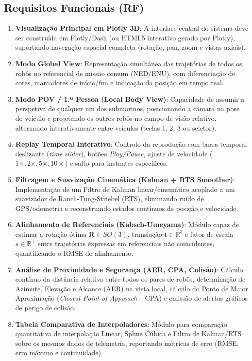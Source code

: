\documentclass[11pt,a4paper]{article}
\newcommand{\vv}[1]{\mathbf{#1}}
\newcommand{\Rot}{\mathbf{R}}
\begin{document}
\subsection{Requisitos Funcionais (RF)}

\begin{enumerate}[label=\textbf{RF\arabic*:},leftmargin=1.5cm]
    \item \textbf{Visualização Principal em Plotly 3D}: A interface central do sistema deve ser construída em Plotly/Dash (ou HTML5 interativo gerado por Plotly), suportando navegação espacial completa (rotação, pan, zoom e vistas axiais).
    \item \textbf{Modo Global View}: Representação simultânea das trajetórias de todos os robôs no referencial de missão comum (NED/ENU), com diferenciação de cores, marcadores de início/fim e indicação da posição em tempo real.
    \item \textbf{Modo POV / 1.ª Pessoa (Local Body View)}: Capacidade de assumir a perspetiva de qualquer um dos submarinos, posicionando a câmara na pose do veículo e projetando os outros robôs no campo de visão relativo, alternando interativamente entre veículos (teclas 1, 2, 3 ou seletor).
    \item \textbf{Replay Temporal Interativo}: Controlo da reprodução com barra temporal deslizante (\textit{time slider}), botões \textit{Play/Pause}, ajuste de velocidade ($1\times, 2\times, 5\times, 10\times$) e salto para instantes específicos.
    \item \textbf{Filtragem e Suavização Cinemática (Kalman + RTS Smoother)}: Implementação de um Filtro de Kalman linear/cinemático acoplado a um suavizador de Rauch-Tung-Striebel (RTS), eliminando ruído de GPS/odometria e reconstruindo estados contínuos de posição e velocidade.
    \item \textbf{Alinhamento de Referenciais (Kabsch-Umeyama)}: Módulo capaz de estimar a rotação ótima $\Rot \in SO(3)$, translação $\vv{t} \in \mathbb{R}^3$ e fator de escala $s \in \mathbb{R}^+$ entre trajetórias expressas em referenciais não coincidentes, quantificando o RMSE do alinhamento.
    \item \textbf{Análise de Proximidade e Segurança (AER, CPA, Colisão)}: Cálculo contínuo da distância relativa entre todos os pares de robôs, determinação de Azimute, Elevação e Alcance (AER) na vista local, cálculo do Ponto de Maior Aproximação (\textit{Closest Point of Approach} -- CPA) e emissão de alertas gráficos de perigo de colisão.
    \item \textbf{Tabela Comparativa de Interpoladores}: Módulo para comparação quantitativa de interpolação Linear, Spline Cúbica e Filtro de Kalman/RTS sobre os mesmos dados de telemetria, reportando métricas de erro (RMSE, erro máximo e continuidade).

\end{enumerate}
\end{document}
